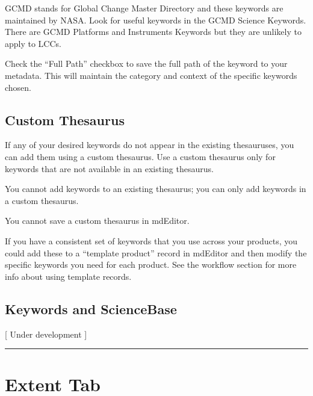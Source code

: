 \documentclass[
]{book}
\makeatletter
\newenvironment{kframe}{%
\medskip{}
\setlength{\fboxsep}{.8em}
 \def\at@end@of@kframe{}%
 \ifinner\ifhmode%
  \def\at@end@of@kframe{\end{minipage}}%
  \begin{minipage}{\columnwidth}%
 \fi\fi%
 \def\FrameCommand##1{\hskip\@totalleftmargin \hskip-\fboxsep
 \colorbox{shadecolor}{##1}\hskip-\fboxsep
     \hskip-\linewidth \hskip-\@totalleftmargin \hskip\columnwidth}%
 \MakeFramed {\advance\hsize-\width
   \@totalleftmargin\z@ \linewidth\hsize
   \@setminipage}}%
 {\par\unskip\endMakeFramed%
 \at@end@of@kframe}
\newenvironment{rmdblock}[1]
  {
  \begin{itemize}
  \renewcommand{\labelitemi}{
    \raisebox{-.7\height}[0pt][0pt]{
      {\setkeys{Gin}{width=3em,keepaspectratio}\texttt{[image: images/\#1]}}
    }
  }
  \setlength{\fboxsep}{1em}
  \begin{kframe}
  \item
  }
  {
  \end{kframe}
  \end{itemize}
  }
\newenvironment{rmdtip}
  {\begin{rmdblock}{tip}}
  {\end{rmdblock}}
\makeatother
\begin{document}
GCMD stands for Global Change Master Directory and these keywords are maintained by NASA. Look for useful keywords in the GCMD Science Keywords. There are GCMD Platforms and Instruments Keywords but they are unlikely to apply to LCCs.

\begin{rmdtip}
Check the ``Full Path'' checkbox to save the full path of the keyword to
your metadata. This will maintain the category and context of the
specific keywords chosen.
\end{rmdtip}

\hypertarget{custom-thesaurus-1}{%
\subsection{Custom Thesaurus}\label{custom-thesaurus-1}}

If any of your desired keywords do not appear in the existing thesauruses, you can add them using a custom thesaurus. Use a custom thesaurus only for keywords that are not available in an existing thesaurus.

You cannot add keywords to an existing thesaurus; you can only add keywords in a custom thesaurus.

You cannot save a custom thesaurus in mdEditor.

\begin{rmdtip}
If you have a consistent set of keywords that you use across your
products, you could add these to a ``template product'' record in
mdEditor and then modify the specific keywords you need for each
product. See the workflow section for more info about using template
records.
\end{rmdtip}

\hypertarget{keywords-and-sciencebase-1}{%
\subsection{Keywords and ScienceBase}\label{keywords-and-sciencebase-1}}

{[} Under development {]}

\begin{center}\rule{0.5\linewidth}{\linethickness}\end{center}

\hypertarget{product-extent}{%
\section{Extent Tab}\label{product-extent}}
\end{document}
